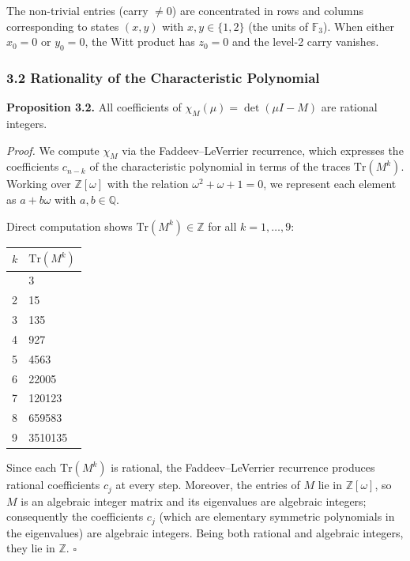 \documentclass[
  11pt,
]{article}
\begin{document}
The non-trivial entries (carry \(\neq 0\)) are concentrated in rows and columns
corresponding to states \((x, y)\) with \(x, y \in \lbrace{}1, 2\rbrace{}\) (the
units of \(\mathbb{F}_3\)). When either \(x_0 = 0\) or \(y_0 = 0\), the Witt
product has \(z_0 = 0\) and the level-2 carry vanishes.

\subsubsection{3.2 Rationality of the Characteristic
Polynomial}\label{rationality-of-the-characteristic-polynomial}

\textbf{Proposition 3.2.} All coefficients of \(\chi_M(\mu) = \det(\mu I - M)\)
are rational integers.

\emph{Proof.} We compute \(\chi_M\) via the Faddeev--LeVerrier recurrence, which
expresses the coefficients \(c_{n-k}\) of the characteristic polynomial in terms
of the traces \(\mathrm{Tr}(M^k)\). Working over \(\mathbb{Z}[\omega]\) with the
relation \(\omega^2 + \omega + 1 = 0\), we represent each element as
\(a + b\omega\) with \(a, b \in \mathbb{Q}\).

Direct computation shows \(\mathrm{Tr}(M^k) \in \mathbb{Z}\) for all
\(k = 1, \ldots, 9\):

\begin{longtable}[]{@{}ll@{}}
\toprule\noalign{}
\(k\) & \(\mathrm{Tr}(M^k)\) \\
\midrule\noalign{}
\endhead
\bottomrule\noalign{}
\endlastfoot
1 & 3 \\
2 & 15 \\
3 & 135 \\
4 & 927 \\
5 & 4563 \\
6 & 22005 \\
7 & 120123 \\
8 & 659583 \\
9 & 3510135 \\
\end{longtable}

Since each \(\mathrm{Tr}(M^k)\) is rational, the Faddeev--LeVerrier recurrence
produces rational coefficients \(c_j\) at every step. Moreover, the entries of
\(M\) lie in \(\mathbb{Z}[\omega]\), so \(M\) is an algebraic integer matrix and
its eigenvalues are algebraic integers; consequently the coefficients \(c_j\)
(which are elementary symmetric polynomials in the eigenvalues) are algebraic
integers. Being both rational and algebraic integers, they lie in
\(\mathbb{Z}\). \(\square\)
\end{document}
